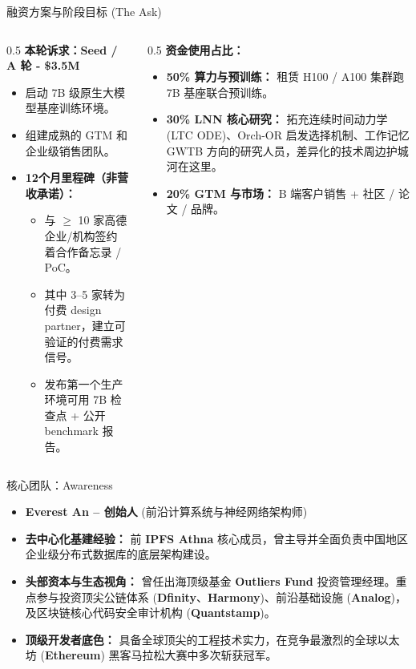 ﻿\documentclass[aspectratio=169, 10pt]{beamer}
\begin{document}
\begin{frame}{融资方案与阶段目标 (The Ask)}
\begin{columns}
\begin{column}{0.5\textwidth}
\textbf{本轮诉求：Seed / A 轮 - \$3.5M}
\vspace{0.5em}
\begin{itemize}
    \item 启动 7B 级原生大模型基座训练环境。
    \item 组建成熟的 GTM 和企业级销售团队。
    \item \textbf{12个月里程碑（非营收承诺）：}
    \begin{itemize}\footnotesize
        \item 与 $\geq$ 10 家高德企业/机构签约 着合作备忘录 / PoC。
        \item 其中 3--5 家转为付费 design partner，建立可验证的付费需求信号。
        \item 发布第一个生产环境可用 7B 检查点 + 公开 benchmark 报告。
    \end{itemize}
\end{itemize}
\end{column}
\begin{column}{0.5\textwidth}
\textbf{资金使用占比：}
\begin{itemize}
    \item \textbf{50\% 算力与预训练：} 租赁 H100 / A100 集群跑 7B 基座联合预训练。
    \item \textbf{30\% LNN 核心研究：} 拓充连续时间动力学 (LTC ODE)、Orch-OR 启发选择机制、工作记忆 GWTB 方向的研究人员，差异化的技术周边护城河在这里。
    \item \textbf{20\% GTM 与市场：} B 端客户销售 + 社区 / 论文 / 品牌。
\end{itemize}
\end{column}
\end{columns}
\end{frame}

\begin{frame}{核心团队：Awareness}
\begin{itemize}
    \item \textbf{Everest An -- 创始人} (前沿计算系统与神经网络架构师)
    \vspace{0.5em}
    \item \textbf{去中心化基建经验：} 前 \textbf{IPFS Athna} 核心成员，曾主导并全面负责中国地区企业级分布式数据库的底层架构建设。
    \item \textbf{头部资本与生态视角：} 曾任出海顶级基金 \textbf{Outliers Fund} 投资管理经理。重点参与投资顶尖公链体系 (\textbf{Dfinity}、\textbf{Harmony})、前沿基础设施 (\textbf{Analog})，及区块链核心代码安全审计机构 (\textbf{Quantstamp})。
    \item \textbf{顶级开发者底色：} 具备全球顶尖的工程技术实力，在竞争最激烈的全球以太坊 (\textbf{Ethereum}) 黑客马拉松大赛中多次斩获冠军。
\end{itemize}
\end{frame}
\end{document}
